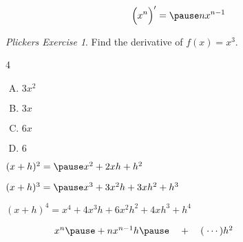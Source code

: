 \documentclass[17pt]{beamer}
\theoremstyle{remark}
\newtheorem{plickers}{Plickers Exercise}
\begin{document}
\begin{frame}
\begin{theorem}%
\[\Big(x^n\Big)' = \pause nx^{n-1}\]
\end{theorem}

\pause
\begin{plickers}
Find the derivative of $f(x) = x^3$.
\begin{multicols}4
\begin{enumerate}[A.]
\item $3x^2$ \item $3x$ \item $6x$ \item $6$
\end{enumerate}
\end{multicols}
\end{plickers}
\end{frame}

\begin{frame}
\begin{fact}
$(x+h)^2 = \pause x^2 + 2xh + h^2$ \pause\par\bigskip
$(x+h)^3 = \pause x^3 + 3x^2h + 3xh^2 + h^3$ \pause\par\bigskip
$(x+h)^4 = x^4 + 4x^3h + 6x^2h^2 + 4xh^3 + h^4$ \pause\par\bigskip\bigskip

%

$\phantom{(x+h)^n = {}}x^n \pause + nx^{n-1}h \pause \quad+\quad (\hspace{0.6ex}\cdots)h^2$ 

\end{fact}
\end{frame}
\end{document}
